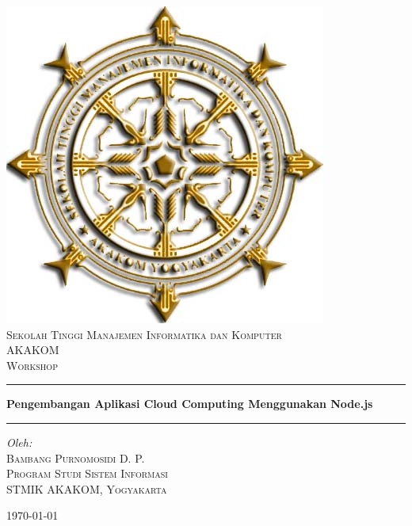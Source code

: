 \begin{titlepage}

\begin{center}

\includegraphics[scale=0.5]{images/logo-akakom-emas.jpg}\\[1cm]

\textsc{\Large Sekolah Tinggi Manajemen Informatika dan Komputer
}\\[0.3cm]
\textsc{\LARGE AKAKOM}\\[1.5cm]

\textsc{\Large Workshop}\\[0.5cm]

\hrule\vspace{5mm}
\noindent
{ \huge \bfseries Pengembangan Aplikasi Cloud Computing Menggunakan Node.js}\\[0.4cm]
\hrule\vspace{15mm}

\begin{center} \small
\emph{Oleh:}\\
\vspace{20mm}
\textsc{Bambang Purnomosidi D. P.}\\
\textsc{Program Studi Sistem Informasi}\\
\textsc{STMIK AKAKOM, Yogyakarta}
\end{center}
\vfill

{\large \today}

\end{center}

\end{titlepage}
